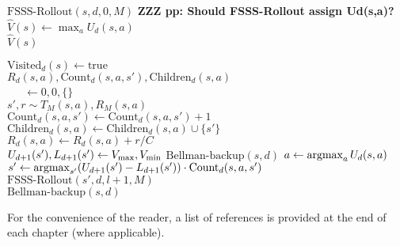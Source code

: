 \begin{algorithm}[tb]
	\caption{$\mbox{FSSS}(s, d, t, M)$}
	\label{alg:fs3}

	 {
		$\mbox{FSSS-Rollout}(s, d, 0, M)$
	}
	{\bf ZZZ pp: Should FSSS-Rollout assign Ud(s,a)?}
	$\hat V(s) \leftarrow \max_a U_d(s, a)$\\
	\Return $\hat V(s)$
\end{algorithm}

\begin{algorithm}[tb]
	\caption{$\mbox{FSSS-Rollout}(s, d, l, M)$}
	\label{alg:fs3-rollout}
	 {
		\Return
	}
	 {
		$\mbox{Visited}_d(s) \leftarrow \mbox{true}$\\
		 {
			$R_d(s,a),\mbox{Count}_d(s,a,s'),\mbox{Children}_d(s,a)$\\
			\ \ \ $\leftarrow 0, 0, \{\}$\\
			 {
				$s', r \sim T_M(s, a), R_M(s,a)$ \\
				$\mbox{Count}_d(s,a,s') \leftarrow \mbox{Count}_d(s,a,s') + 1$ \\
				$\mbox{Children}_d(s,a) \leftarrow \mbox{Children}_d(s,a) \cup \{s'\}$ \\
				$R_d(s,a) \leftarrow R_d(s, a)+r/C$\\
				 {
					 $U_{d+1}(s'), L_{d+1}(s') \leftarrow V_{\rm max}, V_{\rm min}$
				}
			}
		}
		$\mbox{Bellman-backup}(s, d)$
	}
	$a \leftarrow \argmax_a U_d(s,a)$\\
	$s' \leftarrow \argmax_{s'} (U_{d+1}(s')-L_{d+1}(s')) \cdot \mbox{Count}_d(s,a,s')$\\
	$\mbox{FSSS-Rollout}(s', d, l+1, M)$\\
	$\mbox{Bellman-backup}(s, d)$\\
	\Return
\end{algorithm}



%
\ifperchapterbib%
For the convenience of the reader, a list of references is provided at the end of each chapter (where applicable).
\ifendbib%
\else\fi%
\else\fi%
